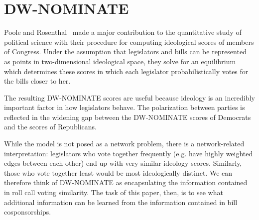 \section{DW-NOMINATE}

Poole and Rosenthal~\cite{Poole} made a major contribution to the quantitative study of political science with their procedure for computing ideological scores of members of Congress. Under the assumption that legislators and bills can be represented as points in two-dimensional ideological space, they solve for an equilibrium which determines these scores in which each legislator probabilistically votes for the bills closer to her.

The resulting DW-NOMINATE scores are useful because ideology is an incredibly important factor in how legislators behave. The polarization between parties is reflected in the widening gap between the DW-NOMINATE scores of Democrats and the scores of Republicans. 

While the model is not posed as a network problem, there is a network-related interpretation: legislators who vote together frequently (e.g. have highly weighted edges between each other) end up with very similar ideology scores. Similarly, those who vote together least would be most ideologically distinct. We can therefore think of DW-NOMINATE as encapsulating the information contained in roll call voting similarity. The task of this paper, then, is to see what additional information can be learned from the information contained in bill cosponsorships.